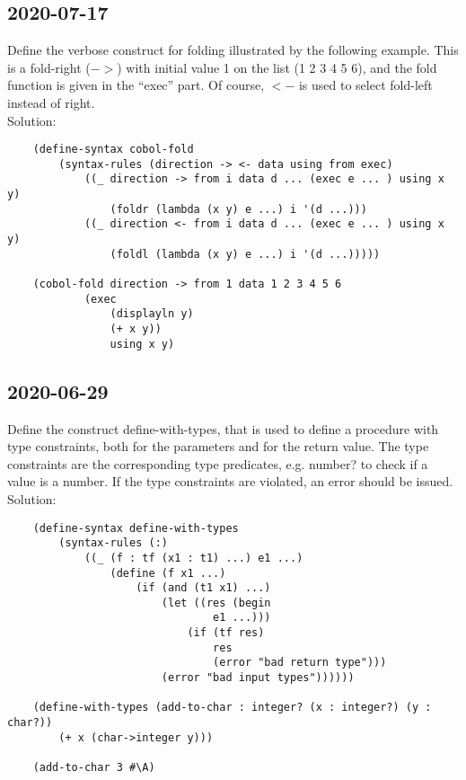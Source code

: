 \subsection{2020-07-17}
Define the verbose construct for folding illustrated by the following example.
This is a fold-right ($->$) with initial value 1 on the list (1 2 3 4 5 6),
and the fold function is given in the ``exec'' part.
Of course, $<-$ is used to select fold-left instead of right.\\
Solution:
\begin{lstlisting}
	(define-syntax cobol-fold
		(syntax-rules (direction -> <- data using from exec)
			((_ direction -> from i data d ... (exec e ... ) using x y)
				(foldr (lambda (x y) e ...) i '(d ...)))
			((_ direction <- from i data d ... (exec e ... ) using x y)
				(foldl (lambda (x y) e ...) i '(d ...)))))
	
	(cobol-fold direction -> from 1 data 1 2 3 4 5 6
			(exec
				(displayln y)
				(+ x y))
				using x y)
\end{lstlisting}





\subsection{2020-06-29}
Define the construct define-with-types, that is used to define a procedure with type constraints, both for the parameters and for the return value.
The type constraints are the corresponding type predicates, e.g. number? to check if a value is a number.
If the type constraints are violated, an error should be issued.\\
Solution:
\begin{lstlisting}
	(define-syntax define-with-types
		(syntax-rules (:)
			((_ (f : tf (x1 : t1) ...) e1 ...)
				(define (f x1 ...)
					(if (and (t1 x1) ...)
						(let ((res (begin
								e1 ...)))
							(if (tf res)
								res
								(error "bad return type")))
						(error "bad input types"))))))
	
	(define-with-types (add-to-char : integer? (x : integer?) (y : char?))
		(+ x (char->integer y)))
	
	(add-to-char 3 #\A)
\end{lstlisting}





